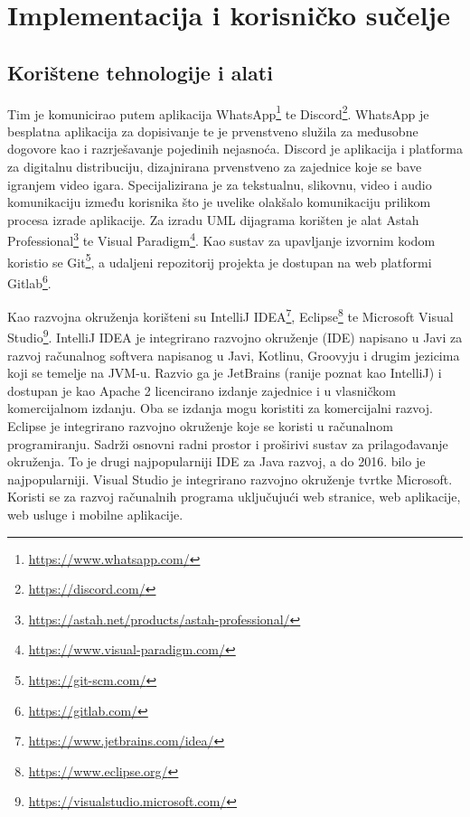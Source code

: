 \chapter{Implementacija i korisničko sučelje}
		
		
		\section{Korištene tehnologije i alati}
		
		Tim je komunicirao putem aplikacija WhatsApp\footnote{\url{https://www.whatsapp.com/}} te Discord\footnote{\url{https://discord.com/}}. WhatsApp je besplatna aplikacija za dopisivanje te je prvenstveno služila za međusobne dogovore kao i razrješavanje pojedinih nejasnoća. Discord je  aplikacija i platforma za digitalnu distribuciju, dizajnirana prvenstveno za zajednice koje se bave igranjem video igara. Specijalizirana je za tekstualnu, slikovnu, video i audio komunikaciju između korisnika što je uvelike olakšalo komunikaciju prilikom procesa izrade aplikacije. Za izradu UML dijagrama korišten je alat Astah Professional\footnote{\url{https://astah.net/products/astah-professional/}} te Visual Paradigm\footnote{\url{https://www.visual-paradigm.com/}}. Kao sustav za upavljanje izvornim kodom koristio se Git\footnote{\url{https://git-scm.com/}}, a udaljeni repozitorij projekta je dostupan na web platformi Gitlab\footnote{\url{https://gitlab.com/}}.
		\newline

Kao razvojna okruženja korišteni su IntelliJ IDEA\footnote{\url{https://www.jetbrains.com/idea/}}, Eclipse\footnote{\url{https://www.eclipse.org/}} te Microsoft Visual Studio\footnote{\url{https://visualstudio.microsoft.com/}}. IntelliJ IDEA je integrirano razvojno okruženje (IDE) napisano u Javi za razvoj računalnog softvera napisanog u Javi, Kotlinu, Groovyju i drugim jezicima koji se temelje na JVM-u. Razvio ga je JetBrains (ranije poznat kao IntelliJ) i dostupan je kao Apache 2 licencirano izdanje zajednice i u vlasničkom komercijalnom izdanju. Oba se izdanja mogu koristiti za komercijalni razvoj. Eclipse je integrirano razvojno okruženje koje se koristi u računalnom programiranju. Sadrži osnovni radni prostor i proširivi sustav za prilagođavanje okruženja. To je drugi najpopularniji IDE za Java razvoj, a do 2016. bilo je najpopularniji. Visual Studio je integrirano razvojno okruženje tvrtke Microsoft. Koristi se za razvoj računalnih programa uključujući web stranice, web aplikacije, web usluge i mobilne aplikacije.
		\newline

